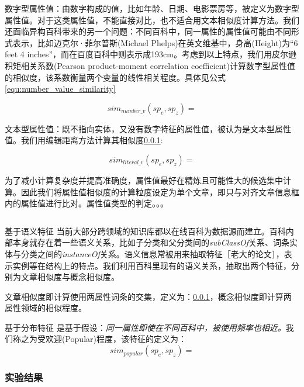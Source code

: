 数字型属性值：由数字构成的值，比如年龄、日期、电影票房等，被定义为数字型属性值。对于这类属性值，不能直接对比，也不适合用文本相似度计算方法。我们还面临异构百科带来的另一个问题：不同百科中，同一属性的属性值可能由不同形式表示，比如迈克尔·菲尔普斯(Michael Phelps)在英文维基中，身高(Height)为“6 feet 4 inches”，而在百度百科中则表示成193cm。考虑到以上特点，我们用皮尔逊积矩相关系数(Pearson product-moment correlation coefficient)计算数字型属性值的相似度，该系数衡量两个变量的线性相关程度。具体见公式\ref{equ:number_value_similarity}

\begin{equation}
\label{equ:number_value_similarity}
sim_{number\_v}(sp_e, sp_z) =
\end{equation}

文本型属性值：既不指向实体，又没有数字特征的属性值，被认为是文本型属性值。我们用编辑距离方法计算其相似度\ref{}:

\begin{equation}
\label{equ:literal_value_similarity}
sim_{literal\_v}(sp_e, sp_z) =
\end{equation}

为了减小计算复杂度并提高准确度，属性值最好在精炼且可能性大的候选集中计算。因此我们将属性值相似度的计算粒度设定为单个文章，即只与对齐文章信息框内的属性值进行比对。属性值类型的判定。。。

\begin{equation}
\end{equation}

{\heiti 基于语义特征}
当前大部分跨领域的知识库都以在线百科为数据源而建立。百科内部本身就存在着一些语义关系，比如子分类和父分类间的\textit{subClassOf}关系、词条实体与分类之间的\textit{instanceOf}关系。语义信息常被用来抽取特征［老大的论文］，表示实例等在结构上的特点。我们利用百科里现有的语义关系，抽取出两个特征，分别为文章相似度与概念相似度。

文章相似度即计算使用两属性词条的交集，定义为：\ref{}，概念相似度即计算两属性领域的相似程度。

{\heiti 基于分布特征}
是基于假设：\textit{同一属性即使在不同百科中，被使用频率也相近。}我们称之为受欢迎(Popular)程度，该特征的定义为：
\begin{equation}
sim_{popular}(sp_e, sp_z) =
\end{equation}

\subsubsection{实验结果}

